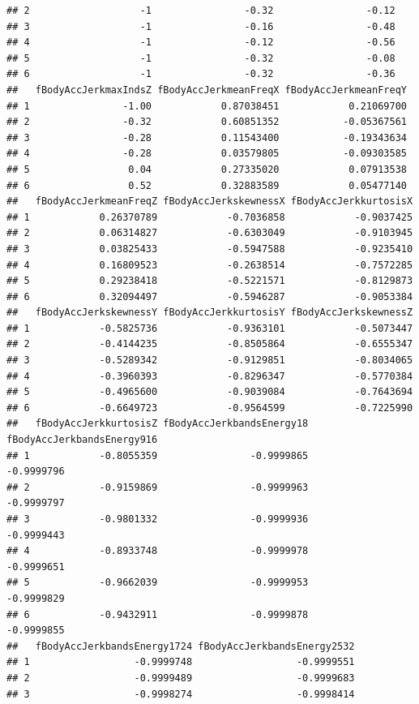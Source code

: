\documentclass[
]{article}
\begin{document}
\begin{verbatim}
## 2                   -1                -0.32                -0.12
## 3                   -1                -0.16                -0.48
## 4                   -1                -0.12                -0.56
## 5                   -1                -0.32                -0.08
## 6                   -1                -0.32                -0.36
##   fBodyAccJerkmaxIndsZ fBodyAccJerkmeanFreqX fBodyAccJerkmeanFreqY
## 1                -1.00            0.87038451            0.21069700
## 2                -0.32            0.60851352           -0.05367561
## 3                -0.28            0.11543400           -0.19343634
## 4                -0.28            0.03579805           -0.09303585
## 5                 0.04            0.27335020            0.07913538
## 6                 0.52            0.32883589            0.05477140
##   fBodyAccJerkmeanFreqZ fBodyAccJerkskewnessX fBodyAccJerkkurtosisX
## 1            0.26370789            -0.7036858            -0.9037425
## 2            0.06314827            -0.6303049            -0.9103945
## 3            0.03825433            -0.5947588            -0.9235410
## 4            0.16809523            -0.2638514            -0.7572285
## 5            0.29238418            -0.5221571            -0.8129873
## 6            0.32094497            -0.5946287            -0.9053384
##   fBodyAccJerkskewnessY fBodyAccJerkkurtosisY fBodyAccJerkskewnessZ
## 1            -0.5825736            -0.9363101            -0.5073447
## 2            -0.4144235            -0.8505864            -0.6555347
## 3            -0.5289342            -0.9129851            -0.8034065
## 4            -0.3960393            -0.8296347            -0.5770384
## 5            -0.4965600            -0.9039084            -0.7643694
## 6            -0.6649723            -0.9564599            -0.7225990
##   fBodyAccJerkkurtosisZ fBodyAccJerkbandsEnergy18 fBodyAccJerkbandsEnergy916
## 1            -0.8055359                -0.9999865                 -0.9999796
## 2            -0.9159869                -0.9999963                 -0.9999797
## 3            -0.9801332                -0.9999936                 -0.9999443
## 4            -0.8933748                -0.9999978                 -0.9999651
## 5            -0.9662039                -0.9999953                 -0.9999829
## 6            -0.9432911                -0.9999878                 -0.9999855
##   fBodyAccJerkbandsEnergy1724 fBodyAccJerkbandsEnergy2532
## 1                  -0.9999748                  -0.9999551
## 2                  -0.9999489                  -0.9999683
## 3                  -0.9998274                  -0.9998414

\end{verbatim}
\end{document}
